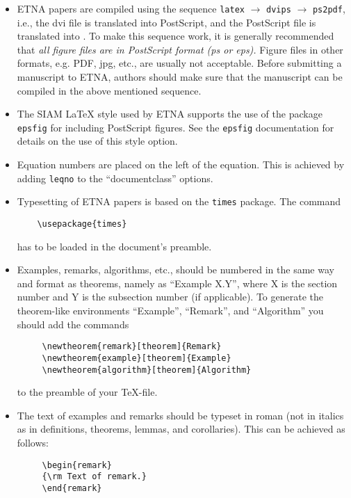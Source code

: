 \documentclass{scrartcl}
\begin{document}
\begin{itemize}
\item ETNA papers are compiled using the sequence \texttt{latex} $\rightarrow$
  \texttt{dvips} $\rightarrow$ \texttt{ps2pdf}, i.e., the dvi file is
  translated into PostScript, and the PostScript file is translated into \@PDF.
  To make this sequence work, it is generally recommended that \emph{all figure
    files are in PostScript format (ps or eps).} Figure files in other formats,
    e.g.  PDF, jpg, etc., are usually not acceptable. Before submitting a
    manuscript to ETNA, authors should make sure that the manuscript can be
    compiled in the above mentioned sequence.
%
\item The SIAM {\LaTeX} style used by ETNA supports the
use of the package \texttt{epsfig} for including PostScript figures. See
the \texttt{epsfig} documentation for details on the use of this style option.
%
\item Equation numbers are placed on the left of the equation. This is
achieved by adding \texttt{leqno} to the ``documentclass'' options.
%
\item Typesetting of ETNA papers is based on the \texttt{times} package.
The command
\begin{verbatim}
    \usepackage{times}
\end{verbatim}
has to be loaded in the document's preamble.
%
%
\item Examples, remarks, algorithms, etc., should be numbered in the same way
  and format as theorems, namely as ``Example X.Y'', where X is the section
  number and Y is the subsection number (if applicable). To generate the
  theorem-like environments ``Example'', ``Remark'', and ``Algorithm'' you
  should add the commands
\begin{verbatim}
     \newtheorem{remark}[theorem]{Remark}
     \newtheorem{example}[theorem]{Example}
     \newtheorem{algorithm}[theorem]{Algorithm}
\end{verbatim}
to the preamble of your \TeX-file.
%
\item The text of examples and remarks should be typeset in roman (not in
  italics as in definitions, theorems, lemmas, and corollaries).  This can be
  achieved as follows:
\begin{verbatim}
     \begin{remark}
     {\rm Text of remark.}
     \end{remark}
\end{verbatim}

\end{itemize}
\end{document}
